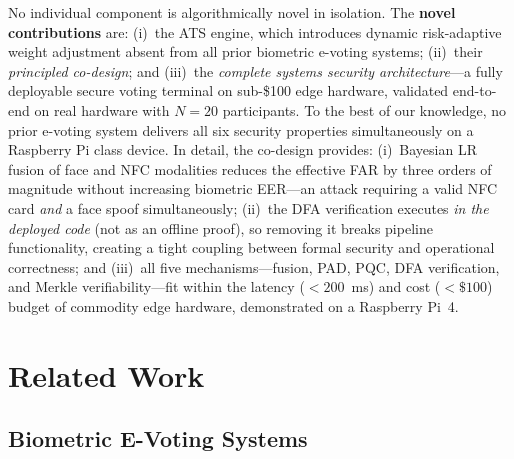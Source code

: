 \documentclass[conference]{IEEEtran}
\begin{document}
No individual component is algorithmically novel in isolation.
The \textbf{novel contributions} are: (i)~the ATS engine, which introduces
dynamic risk-adaptive weight adjustment absent from all prior biometric
e-voting systems; (ii)~their \emph{principled co-design}; and
(iii)~the \emph{complete systems security architecture}—a fully
deployable secure voting terminal on sub-\$100 edge hardware,
validated end-to-end on real hardware with \(N{=}20\) participants.
To the best of our knowledge, no prior e-voting system delivers all six
security properties simultaneously on a Raspberry Pi class device. In detail, the
co-design provides:
(i)~Bayesian LR fusion of face and NFC modalities reduces the effective FAR
by three orders of magnitude without increasing biometric EER—an attack requiring
a valid NFC card \emph{and} a face spoof simultaneously;
(ii)~the DFA verification executes \emph{in the deployed code} (not as an
offline proof), so removing it breaks pipeline functionality, creating a tight
coupling between formal security and operational correctness;
and (iii)~all five mechanisms—fusion, PAD, PQC, DFA verification, and Merkle
verifiability—fit within the latency (\(<200\)~ms) and cost (\(<\$100\))
budget of commodity edge hardware, demonstrated on a Raspberry Pi~4.

\section{Related Work}
\label{sec:related}

\subsection{Biometric E-Voting Systems}
\end{document}
